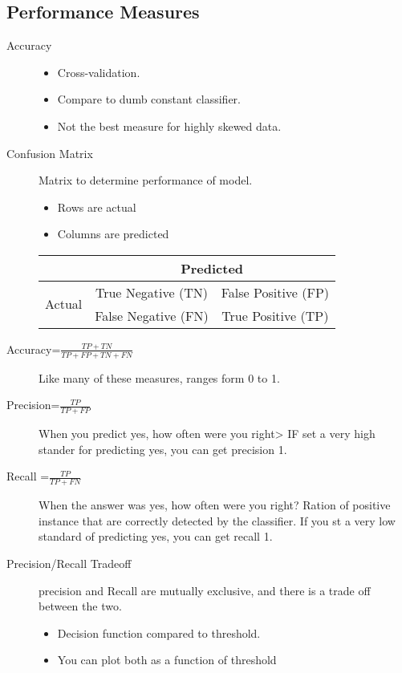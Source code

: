 \documentclass[10pt]{article}
\begin{document}
\subsection{Performance Measures}%
\label{sub:preformance_measures}

\begin{description}
  \item[Accuracy]
    \begin{itemize}
      \item Cross-validation.
      \item Compare to dumb constant classifier.
      \item Not the best measure for highly skewed data.
    \end{itemize}
  \item[Confusion Matrix]
    Matrix to determine performance of model.
    \begin{itemize}
      \item Rows are actual
      \item Columns are predicted
    \end{itemize}
    \begin{tabular}{|c|cc|}
      \hline
      & \multicolumn{2}{|c|}{Predicted}\\ \hline
      \multirow{2}{*}{Actual} & True Negative (TN) & False Positive (FP) \\
                              &False Negative (FN) & True Positive (TP)\\ \hline
    \end{tabular}
  \item[Accuracy=\(\frac{TP+TN}{TP+FP+TN+FN}\)] Like many of these measures, ranges form 0  to 1.
  \item[Precision=\(\frac{TP}{TP+FP}\)] When you predict yes, how often were
    you right> IF set a very high stander for predicting yes, you can get
    precision 1.
  \item[Recall =\(\frac{TP}{TP+FN}\)] When the answer was yes, how often were
    you right? Ration of positive instance that are correctly detected by the
    classifier. If you st a very low standard of predicting yes, you can get
    recall 1.
  \item[Precision/Recall Tradeoff]
    precision and Recall are mutually exclusive, and there is a trade off between
    the two.
    \begin{itemize}
      \item Decision function compared to threshold.
      \item You can plot both as a function of threshold

\end{itemize}
\end{description}
\end{document}
